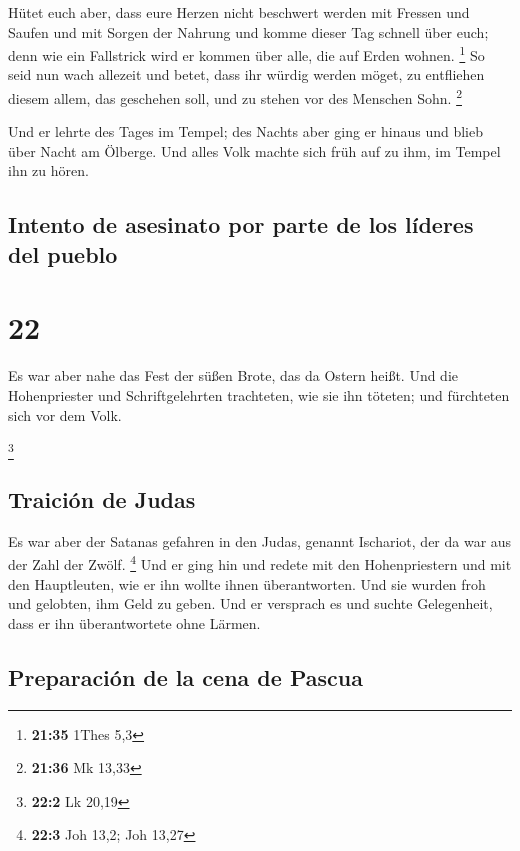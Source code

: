 Hütet euch aber, dass eure Herzen nicht beschwert werden
mit Fressen und Saufen und mit Sorgen der Nahrung und komme dieser Tag
schnell über euch;  denn wie ein Fallstrick wird er
kommen über alle, die auf Erden wohnen. \footnote{\textbf{21:35} 1Thes
  5,3}  So seid nun wach allezeit und betet, dass ihr
würdig werden möget, zu entfliehen diesem allem, das geschehen soll, und
zu stehen vor des Menschen Sohn. \footnote{\textbf{21:36} Mk 13,33}

 Und er lehrte des Tages im Tempel; des Nachts aber ging
er hinaus und blieb über Nacht am Ölberge.  Und alles
Volk machte sich früh auf zu ihm, im Tempel ihn zu hören.

\hypertarget{intento-de-asesinato-por-parte-de-los-luxedderes-del-pueblo}{%
\subsection{Intento de asesinato por parte de los líderes del
pueblo}\label{intento-de-asesinato-por-parte-de-los-luxedderes-del-pueblo}}

\hypertarget{section-21}{%
\section{22}\label{section-21}}

 Es war aber nahe das Fest der süßen Brote, das da Ostern
heißt.  Und die Hohenpriester und Schriftgelehrten
trachteten, wie sie ihn töteten; und fürchteten sich vor dem Volk.

\footnote{\textbf{22:2} Lk 20,19}

\hypertarget{traiciuxf3n-de-judas}{%
\subsection{Traición de Judas}\label{traiciuxf3n-de-judas}}

 Es war aber der Satanas gefahren in den Judas, genannt
Ischariot, der da war aus der Zahl der Zwölf. \footnote{\textbf{22:3}
  Joh 13,2; Joh 13,27}  Und er ging hin und redete mit den
Hohenpriestern und mit den Hauptleuten, wie er ihn wollte ihnen
überantworten.  Und sie wurden froh und gelobten, ihm Geld
zu geben.  Und er versprach es und suchte Gelegenheit,
dass er ihn überantwortete ohne Lärmen.

\hypertarget{preparaciuxf3n-de-la-cena-de-pascua}{%
\subsection{Preparación de la cena de
Pascua}\label{preparaciuxf3n-de-la-cena-de-pascua}}

